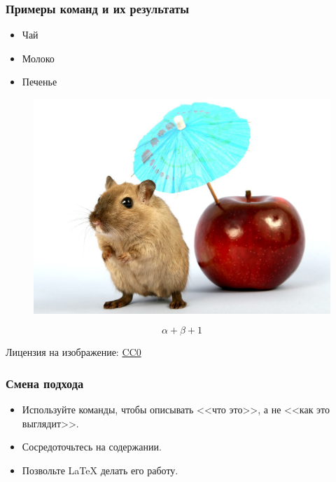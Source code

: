 \documentclass{beamer}
\begin{document}
\begin{frame}[fragile]
\frametitle{Примеры команд и их результаты}
\vspace{-0.5mm}
\begin{exampletwoup}
\begin{itemize}
\item Чай
\item Молоко
\item Печенье
\end{itemize}
\end{exampletwoup}
\vspace{-0.5mm}
\begin{exampletwoup}
\begin{figure}
\includegraphics{gerbil}
\end{figure}
\end{exampletwoup}
\vspace{-0.5mm}
\begin{exampletwoup}
\begin{equation}
\alpha + \beta + 1
\end{equation}
\end{exampletwoup}
\vspace{-3mm}
\tiny{Лицензия на изображение: \href{https://pixabay.com/en/animal-apple-attractive-beautiful-1239390/}{CC0}}
\end{frame}

\begin{frame}[fragile]
\frametitle{Смена подхода}
\begin{itemize}
\item Используйте команды, чтобы описывать <<что это>>, а не <<как это выглядит>>.
\item Сосредоточьтесь на содержании.
\item Позвольте \LaTeX{} делать его работу.
\end{itemize}
\end{frame}
\end{document}

